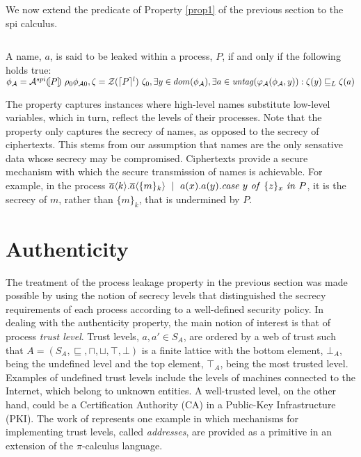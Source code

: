 \documentclass[10pt,a4paper,final,oneside,fleqn]{book}
\begin{document}
We now extend the predicate of Property \ref{prop1} of the previous section to the spi calculus.
\begin{prop}
$ $

\noindent
A name, $a$, is said to be leaked within a process, $P$, if and only if the following holds true:\\
$\phi_\mathcal{A}=\mathcal{A}^{spi}(\![P]\!)~\rho_0\phi_{\mathcal{A}0},\zeta=\mathcal{Z}(\lceil P\rceil^l)~\zeta_0,\exists y\in dom(\phi_\mathcal{A}),\exists a\in\mbox{{\itshape untag\/}}(\varphi_\mathcal{A}(\phi_\mathcal{A},y)):\zeta(y)\sqsubseteq_L\zeta(a)$
\end{prop}
The property captures instances where high-level names substitute low-level variables, which in turn, reflect the levels of their processes.  Note that the property only captures the secrecy of names, as opposed to the secrecy of ciphertexts.  This stems from our assumption that names are the only sensative data whose secrecy may be compromised.  Ciphertexts provide a secure mechanism with which the secure transmission of names is achievable.  For example, in the process $\overline{a}\langle k\rangle.\overline{a}\langle\{m\}_k\rangle~\mid~a(x).a(y).\mbox{{\itshape case\/} }y\mbox{ {\itshape of\/} }\{z\}_x\mbox{ {\itshape in\/} }P$, it is the secrecy of $m$, rather than $\{m\}_k$, that is undermined by $P$.
\section{Authenticity}
The treatment of the process leakage property in the previous section was made possible by using the notion of secrecy levels that distinguished the secrecy requirements of each process according to a well-defined security policy. In dealing with the authenticity property, the main notion of interest is that of process {\itshape trust level\/}.  Trust levels, $a,a'\in S_A$, are ordered by a web of trust such that $A=(S_A,\sqsubseteq,\sqcap,\sqcup,\top,\bot)$ is a finite lattice with the bottom element, $\bot_A$, being the undefined level and the top element, $\top_A$, being the most trusted level.  Examples of undefined trust levels include the levels of machines connected to the Internet, which belong to unknown entities.  A well-trusted level, on the other hand, could be a Certification Authority (CA) in a Public-Key Infrastructure (PKI). The work of \cite{bodei5} represents one example in which mechanisms for implementing trust levels, called {\itshape addresses\/}, are provided as a primitive in an extension of the $\pi$-calculus language.
\end{document}
